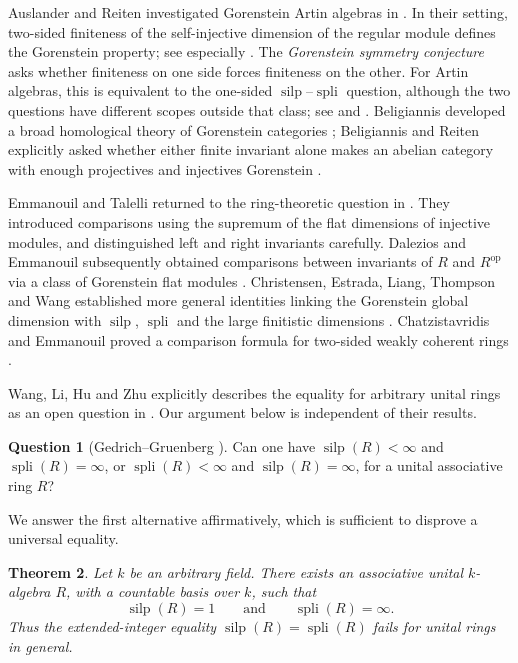 \documentclass[11pt]{amsart}
\newtheorem{theorem}{Theorem}[section]
\theoremstyle{definition}
\newtheorem{question}[theorem]{Question}
\theoremstyle{remark}
\newcommand{\silp}{\operatorname{silp}}
\newcommand{\spli}{\operatorname{spli}}
\newcommand{\op}{\mathrm{op}}
\begin{document}
Auslander and Reiten investigated Gorenstein Artin algebras in \cite{AR1991}. In their setting, two-sided finiteness of the self-injective dimension of the regular module defines the Gorenstein property; see especially \cite[p.~223]{AR1991}. The \emph{Gorenstein symmetry conjecture} asks whether finiteness on one side forces finiteness on the other. For Artin algebras, this is equivalent to the one-sided $\silp$--$\spli$ question, although the two questions have different scopes outside that class; see \cite[p.~408]{ET2011} and \cite[Chapter~VII, p.~123]{BR2007}. Beligiannis developed a broad homological theory of Gorenstein categories \cite{Bel2000}; Beligiannis and Reiten explicitly asked whether either finite invariant alone makes an abelian category with enough projectives and injectives Gorenstein \cite[Chapter~VII, Definition~2.1 and the note after Remark~2.7]{BR2007}.

Emmanouil and Talelli returned to the ring-theoretic question in \cite[pp.~408--410]{ET2011}. They introduced comparisons using the supremum of the flat dimensions of injective modules, and distinguished left and right invariants carefully. Dalezios and Emmanouil subsequently obtained comparisons between invariants of $R$ and $R^{\op}$ via a class of Gorenstein flat modules \cite{DE2023}. Christensen, Estrada, Liang, Thompson and Wang established more general identities linking the Gorenstein global dimension with $\silp$, $\spli$ and the large finitistic dimensions \cite[Theorem~1.18]{CELTW2024}. Chatzistavridis and Emmanouil proved a comparison formula for two-sided weakly coherent rings \cite[Theorem~3.4]{CE2025}.

Wang, Li, Hu and Zhu explicitly describes the equality for arbitrary unital rings as an open question in \cite[p.~3]{WLHZ2026}. Our argument below is independent of their results.

\begin{question}[Gedrich--Gruenberg \cite{GG1987}]\label{q:GG}
Can one have $\silp(R)<\infty$ and $\spli(R)=\infty$, or $\spli(R)<\infty$ and $\silp(R)=\infty$, for a unital associative ring $R$?
\end{question}

We answer the first alternative affirmatively, which is sufficient to disprove a universal equality. 

\begin{theorem}\label{thm:main}
Let $k$ be an arbitrary field. There exists an associative unital $k$-algebra $R$, with a countable basis over $k$, such that
\[
\silp(R)=1\qquad\text{and}\qquad\spli(R)=\infty.
\]
Thus the extended-integer equality $\silp(R)=\spli(R)$ fails for unital rings in general.
\end{theorem}
\end{document}
